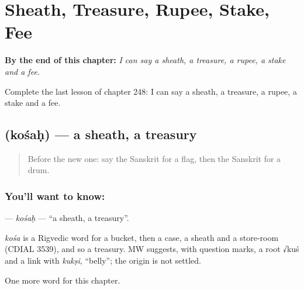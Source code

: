 
\chapter{Sheath, Treasure, Rupee, Stake, Fee}
\label{ch:sa-sheath-treasure-rupee-stake-fee}

\begin{chapteropening}
\textbf{By the end of this chapter:} \emph{I can say a sheath, a treasure, a rupee, a stake and a fee.}

Complete the last lesson of chapter 248: I can say a sheath, a treasure, a rupee, a stake and a fee.
\end{chapteropening}

\section[\texorpdfstring{\sk{कोशः} (kośaḥ)}{कोशः (kośaḥ)}]{ (kośaḥ) — a sheath, a treasury}

\label{lesson:SA-C248-kosah}



\begin{quote}
Before the new one: say the Sanskrit for a flag, then the Sanskrit for a drum.
\end{quote}

\subsection*{You'll want to know: }
\textbf{} — \emph{kośaḥ} — \textquotedblleft{}a sheath, a treasury\textquotedblright{}.

\begin{cousinweb}
\emph{kośa} is a Rigvedic word for a bucket, then a case, a sheath and a store-room (CDIAL 3539), and so a treasury. MW suggests, with question marks, a root √kuś and a link with \emph{kukṣi}, \textquotedblleft{}belly\textquotedblright{}; the origin is not settled.
\end{cousinweb}

\begin{grammarlens}[title={What you've built}]
One more word for this chapter.
\end{grammarlens}

